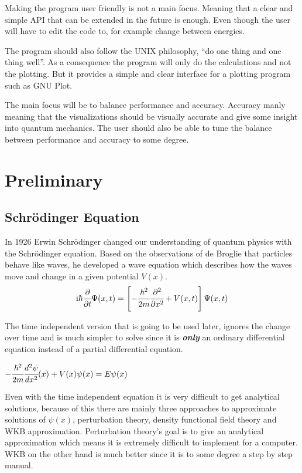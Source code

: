 \documentclass[11pt,DIV=10,final]{scrreprt} %
\newcommand{\mi}{{\text{i}}}
\begin{document}
Making the program user friendly is not a main focus. Meaning that a clear and simple API
that can be extended in the future is enough. Even though the user will have to edit the code
to, for example change between energies.

The program should also follow the UNIX philosophy, ``do one thing and one thing well''.
As a consequence the program will only do the calculations and not the plotting. But it
provides a simple and clear interface for a plotting program such as GNU Plot.

The main focus will be to balance performance and accuracy. Accuracy manly meaning that the
visualizations should be visually accurate and give some insight into quantum mechanics.
The user should also be able to tune the balance between performance and accuracy to some
degree.

\chapter{Preliminary}


\section{Schrödinger Equation}
In 1926 Erwin Schrödinger changed our understanding of quantum physics with the Schrödinger equation. Based on the observations of de Broglie that particles
behave like waves, he developed a wave equation which describes how the waves move and change in a given potential $V(x)$.
\begin{align*}
  \mi\hbar {\cfrac {\partial }{\partial t}}\Psi (x,t)=\left[-{\cfrac {\hbar ^{2}}{2m}}{\cfrac {\partial ^{2}}{\partial x^{2}}}+V(x,t)\right]\Psi (x,t)
\end{align*}

The time independent version that is going to be used later, ignores the change over time and is much simpler to solve since it is \emph{\textbf{only}} an ordinary differential equation instead of a
partial differential equation.
\begin{center}
\begin{math}
  -{\cfrac{\hbar^{2}}{2m}}  \cfrac{d^{2} \psi}{dx^{2}} (x) + V(x) \psi(x) = E \psi(x)
\end{math}
\end{center}

Even with the time independent equation it is very difficult to get analytical solutions, because of this there are mainly three approaches to
approximate solutions of $\psi(x)$, perturbation theory, density functional field theory and WKB approximation. Perturbation theory's goal is to give an analytical approximation which means it
is extremely difficult to implement for a computer. WKB on the other hand is much better since it is to some degree a step by step manual.
\end{document}
